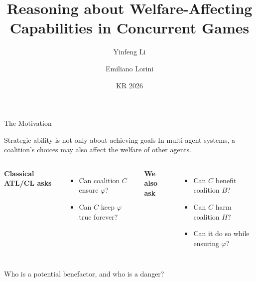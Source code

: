 \documentclass[aspectratio=169,10pt]{beamer}
\title[Welfare-Affecting Capabilities]{Reasoning about Welfare-Affecting Capabilities in Concurrent Games}
\author[Y. Li and E. Lorini]{Yinfeng Li \and Emiliano Lorini}
\institute[IRIT]{IRIT, CNRS, University of Toulouse}
\date[KR 2026]{KR 2026}
\begin{document}
\begin{frame}
  \titlepage
\end{frame}

\begin{frame}{The Motivation}
  \begin{block}{Strategic ability is not only about achieving goals}
    In multi-agent systems, a coalition's choices may also affect the welfare of other agents.
  \end{block}

  \vspace{0.5em}
  \begin{columns}[T,onlytextwidth]
    \textbf{Classical ATL/CL asks}
    \begin{itemize}
      \item Can coalition $C$ ensure $\varphi$?
      \item Can $C$ keep $\varphi$ true forever?
    \end{itemize}

    \textbf{We also ask}
    \begin{itemize}
      \item Can $C$ benefit coalition $B$?
      \item Can $C$ harm coalition $H$?
      \item Can it do so while ensuring $\varphi$?
    \end{itemize}
  \end{columns}

  \vspace{0.6em}
  \centering
  \alert{Who is a potential benefactor, and who is a danger?}
\end{frame}
\end{document}
